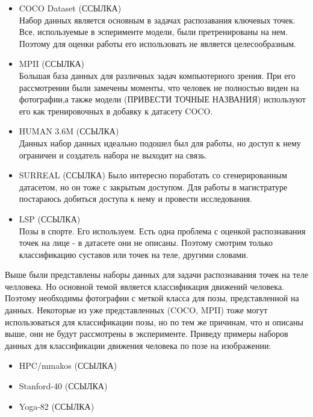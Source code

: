 \begin{itemize}
	\item COCO Dataset (ССЫЛКА)\\
	Набор данных является основным в задачах распозавания ключевых точек. Все, используемые в эсперименте модели, были претренированы на нем. Поэтому для оценки работы его использовать не является целесообразным.
	\item MPII (ССЫЛКА)\\
	Большая база данных для различных задач компьютерного зрения. При его рассмотрении были замечены моменты, что человек не полностью виден на фотографии,а также модели (ПРИВЕСТИ ТОЧНЫЕ НАЗВАНИЯ) используют его как тренировочных в добавку к датасету COCO.
	\item HUMAN 3.6M (ССЫЛКА)\\
	Данных набор данных идеально подошел был для работы, но доступ к нему ограничен и создатель набора не выходит на связь.
	\item SURREAL (ССЫЛКА)
	Было интересно поработать со сгенерированным датасетом, но он тоже с закрытым доступом. Для работы в магистратуре постараюсь добиться доступа к нему и провести исследования.
	\item LSP (ССЫЛКА)\\
	Позы в спорте. Его используем. Есть одна проблема с оценкой распознавания точек на лице - в датасете они не описаны. Поэтому смотрим только классификацию суставов или точек на теле, другими словами.
\end{itemize}

Выше были представлены наборы данных для задачи распознавания точек на теле челловека. Но основной темой является классификация движений человека. Поэтому необходимы фотографии с меткой класса для позы, представленной на данных. Некоторые из уже представленных (COCO, MPII) тоже могут использоваться для классификации позы, но по тем же причинам, что и описаны выше, они не будут рассмотрены в эксперименте. Приведу примеры наборов данных для классификации движения человека по позе на изображении:

\begin{itemize}
	\item HPC/mmakos (ССЫЛКА)\\
	\item Stanford-40 (ССЫЛКА)\\
	\item Yoga-82 (ССЫЛКА)\\
\end{itemize}

